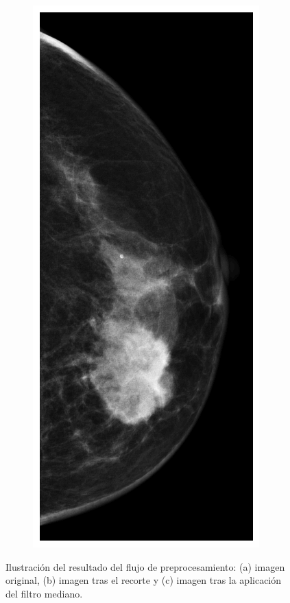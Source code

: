 \documentclass[a4paper,10pt]{book}
\begin{document}
\begin{figure}[h!]
\begin{subfigure}[t]{0.15\textwidth}
\caption{}
\label{fig:pre_cropped}
\end{subfigure}
\begin{subfigure}[t]{0.15\textwidth}
\centering
\includegraphics[width=\textwidth]{reports//assets/preprocess_c.png}
\caption{}
\label{fig:pre_mean}
\end{subfigure}
\caption[Resultado del flujo de preprocesamiento]{Ilustración del resultado del flujo de preprocesamiento: (a) imagen original, (b) imagen tras el recorte y (c) imagen tras la aplicación del filtro mediano.}
\label{fig:preprocessing}
\end{figure}
\end{document}
